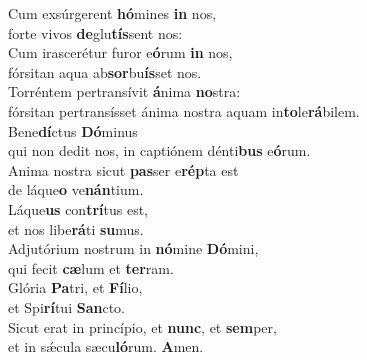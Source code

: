 \evenverse Cum exsúrgerent \textbf{hó}mines \textbf{in} nos,~\*\\
\evenverse forte vivos \textbf{de}glu\textbf{tís}sent nos:\\
\oddverse Cum irascerétur furor e\textbf{ó}rum \textbf{in} nos,~\*\\
\oddverse fórsitan aqua ab\textbf{sor}bu\textbf{ís}set nos.\\
\evenverse Torréntem pertransívit \textbf{á}nima \textbf{no}stra:~\*\\
\evenverse fórsitan pertransísset ánima nostra aquam in\textbf{to}le\textbf{rá}bilem.\\
\oddverse Bene\textbf{dí}ctus \textbf{Dó}minus~\*\\
\oddverse qui non dedit nos, in captiónem dénti\textbf{bus} e\textbf{ó}rum.\\
\evenverse Anima nostra sicut \textbf{pas}ser e\textbf{rép}ta est~\*\\
\evenverse de láque\textbf{o} ve\textbf{nán}tium.\\
\oddverse Láque\textbf{us} con\textbf{trí}tus est,~\*\\
\oddverse et nos libe\textbf{rá}ti \textbf{su}mus.\\
\evenverse Adjutórium nostrum in \textbf{nó}mine \textbf{Dó}mini,~\*\\
\evenverse qui fecit \textbf{cæ}lum et \textbf{ter}ram.\\
\oddverse Glória \textbf{Pa}tri, et \textbf{Fí}lio,~\*\\
\oddverse et Spi\textbf{rí}tui \textbf{San}cto.\\
\evenverse Sicut erat in princípio, et \textbf{nunc}, et \textbf{sem}per,~\*\\
\evenverse et in sǽcula sæcu\textbf{ló}rum. \textbf{A}men.\\
